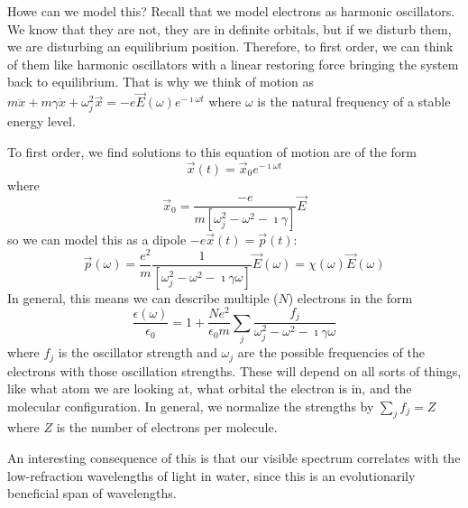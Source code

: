 \documentclass[a4paper,twoside,master.tex]{subfiles}
\begin{document}
Howe can we model this? Recall that we model electrons as harmonic oscillators. We know that they are not, they are in definite orbitals, but if we disturb them, we are disturbing an equilibrium position. Therefore, to first order, we can think of them like harmonic oscillators with a linear restoring force bringing the system back to equilibrium. That is why we think of motion as $ m \ddot{x} + m \gamma \dot{x} + \omega_j^2 \vec{x} = -e \vec{E}(\omega) e^{-\imath \omega t} $ where $ \omega $ is the natural frequency of a stable energy level.

To first order, we find solutions to this equation of motion are of the form
\begin{equation}
    \vec{x}(t) = \vec{x}_0 e^{-\imath\omega t}
\end{equation}
where
\begin{equation}
    \vec{x}_0 = \frac{-e}{m\left[ \omega^2_j - \omega^2 - \imath \gamma \right]} \vec{E}
\end{equation}
so we can model this as a dipole $ -e \vec{x}(t) = \vec{p}(t) $:
\begin{equation}
    \vec{p}(\omega) = \frac{e^2}{m} \frac{1}{[\omega_j^2 - \omega^2 - \imath\gamma\omega]} \vec{E}(\omega) = \chi(\omega) \vec{E}(\omega)
\end{equation}
In general, this means we can describe multiple ($ N $) electrons in the form
\begin{equation}
    \frac{\epsilon(\omega)}{\epsilon_0} = 1 + \frac{N e^2}{\epsilon_0 m} \sum_{j} \frac{f_j}{\omega_j^2 - \omega^2 - \imath\gamma\omega}
\end{equation}
where $ f_j $ is the oscillator strength and $ \omega_j $ are the possible frequencies of the electrons with those oscillation strengths. These will depend on all sorts of things, like what atom we are looking at, what orbital the electron is in, and the molecular configuration. In general, we normalize the strengths by $ \sum_{j} f_j = Z $ where $ Z $ is the number of electrons per molecule.

An interesting consequence of this is that our visible spectrum correlates with the low-refraction wavelengths of light in water, since this is an evolutionarily beneficial span of wavelengths.
\end{document}
